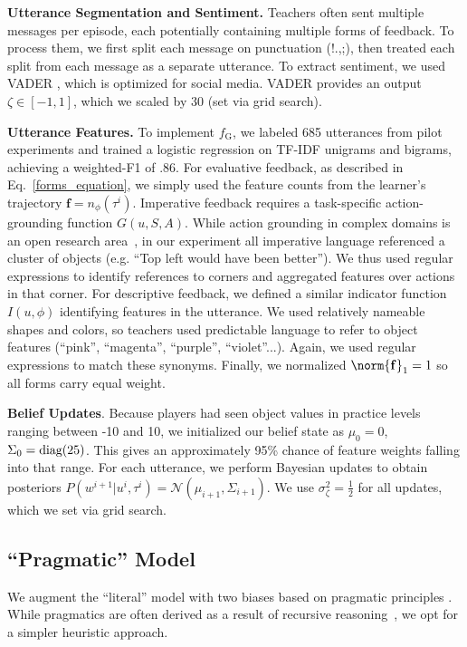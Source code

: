 \documentclass[letterpaper]{article} %
\begin{document}
\textbf{Utterance Segmentation and Sentiment.} Teachers often sent multiple messages per episode, each potentially containing multiple forms of feedback. To process them, we first split each message on punctuation (!.,;), then treated each split from each message as a separate utterance. To extract sentiment, we used VADER \citep{HuttoG14}, which is optimized for social media. VADER provides an output $\zeta \in [-1,1]$, which we scaled by 30 (set via grid search).

\textbf{Utterance Features.} To implement $f_\text{G}$, we labeled 685 utterances from pilot experiments and trained a logistic regression on TF-IDF unigrams and bigrams, achieving a weighted-F1 of .86. For evaluative feedback, as described in Eq.~\ref{forms_equation}, we simply used the feature counts from the learner's trajectory $\mathbf{f} = n_\phi(\tau^i)$. Imperative feedback requires a task-specific action-grounding function $G(u,S,A)$. While action grounding in complex domains is an open research area~\citep{Tellex2020}, in our experiment all imperative language referenced a cluster of objects (e.g. ``Top left would have been better''). We thus used regular expressions to identify references to corners and aggregated features over actions in that corner. For descriptive feedback, we defined a similar indicator function $I(u, \phi)$ identifying features in the utterance. We used relatively nameable shapes and colors, so teachers used predictable language to refer to object features (``pink'', ``magenta'', ``purple'', ``violet''...). Again, we used regular expressions to match these synonyms. Finally, we normalized $\norm{\mathbf{f}}_1 = 1$ so all forms carry equal weight.

\textbf{Belief Updates}. Because players had seen object values in practice levels ranging between -10 and 10, we initialized our belief state as $\mu_0 = 0$, $\Sigma_0 = \mbox{\rm diag}(25)$. This gives an approximately 95\% chance of feature weights falling into that range. For each utterance, we perform Bayesian updates to obtain posteriors $P(w^{i+1} | u^i, \tau^i) = \mathcal{N}(\mu_{i+1},\Sigma_{i+1})$. We use $\sigma_\zeta^2 = \frac{1}{2}$ for all updates, which we set via grid search.

\subsection{``Pragmatic'' Model}
\label{pragmatic_model_desc}
We augment the ``literal'' model with two biases based on pragmatic principles \cite{grice1975logic}. While pragmatics are often derived as a result of recursive reasoning~\cite{goodman_2016}, we opt for a simpler heuristic approach.
\end{document}
